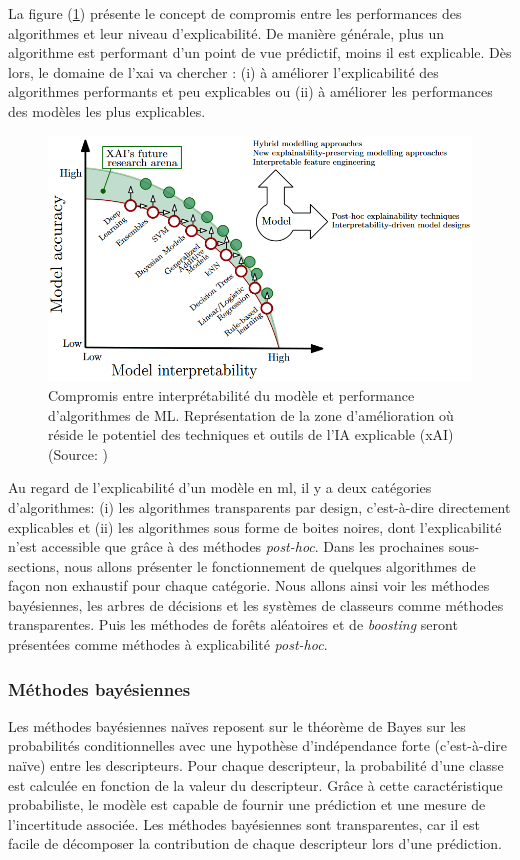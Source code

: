 La figure (\ref{fig:xai-research}) présente le concept de compromis entre les performances des algorithmes et leur niveau d'explicabilité. De manière générale, plus un algorithme est performant d'un point de vue prédictif, moins il est explicable. Dès lors, le domaine de l'\gls{xai} va chercher : (i) à améliorer l'explicabilité des algorithmes performants et peu explicables ou (ii) à améliorer les performances des modèles les plus explicables.
\begin{figure}[!ht]
 \centering
 \includegraphics[width=1\textwidth]{figures/xai-research.png}
 \caption[Compromis entre interprétabilité et performances des algo de ML]{Compromis entre interprétabilité du modèle et performance d'algorithmes de ML. Représentation de la zone d'amélioration où réside le potentiel des techniques et outils de l'IA explicable (xAI) (Source: \cite{arrieta_explainable_2019})}
 \label{fig:xai-research}
\end{figure}

Au regard de l'explicabilité d'un modèle en \gls{ml}, il y a deux catégories d'algorithmes: (i) les algorithmes transparents par design, c'est-à-dire directement explicables et (ii) les algorithmes sous forme de boites noires, dont l'explicabilité n'est accessible que grâce à des méthodes \textit{post-hoc}. Dans les prochaines sous-sections, nous allons présenter le fonctionnement de quelques algorithmes de façon non exhaustif pour chaque catégorie. Nous allons ainsi voir les méthodes bayésiennes, les arbres de décisions et les systèmes de classeurs comme méthodes transparentes. Puis les méthodes de forêts aléatoires et de \textit{boosting} seront présentées comme méthodes à explicabilité \textit{post-hoc}.

\subsubsection{Méthodes bayésiennes}
Les méthodes bayésiennes naïves reposent sur le théorème de Bayes sur les probabilités conditionnelles avec une hypothèse d'indépendance forte (c'est-à-dire naïve) entre les descripteurs. Pour chaque descripteur, la probabilité d'une classe est calculée en fonction de la valeur du descripteur. Grâce à cette caractéristique probabiliste, le modèle est capable de fournir une prédiction et une mesure de l'incertitude associée. Les méthodes bayésiennes sont transparentes, car il est facile de décomposer la contribution de chaque descripteur lors d'une prédiction.

